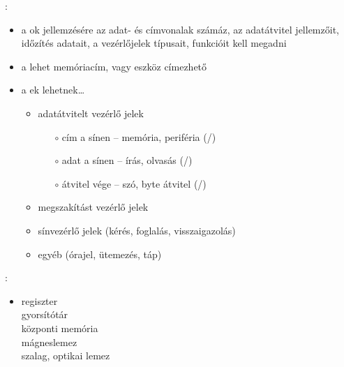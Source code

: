 \documentclass[main.tex]{subfiles}
\begin{document}
  {\large {}:}
  \begin{itemize}
    \item a ok jellemzésére
    az adat- és címvonalak számáz,
    az adatátvitel jellemzőit, időzítés adatait,
    a vezérlőjelek típusait, funkcióit kell megadni

    \item a  lehet memóriacím, vagy
     eszköz címezhető

    \item a ek lehetnek\dots
    \begin{itemize}
      \item adatátvitelt vezérlő jelek
      \begin{itemize}
        \item[$\circ$] cím a sínen
        \tabto{2.7cm} – \tabto{3.3cm}
        memória, periféria (/)

        \item[$\circ$] adat a sínen
        \tabto{2.7cm} – \tabto{3.3cm}
        írás, olvasás (/)

        \item[$\circ$] átvitel vége
        \tabto{2.7cm} – \tabto{3.3cm}
        szó, byte átvitel (/)
      \end{itemize}

      \item megszakítást vezérlő jelek
      \item sínvezérlő jelek (kérés, foglalás, visszaigazolás)
      \item egyéb (órajel, ütemezés, táp)
    \end{itemize}
  \end{itemize}

  
  {\large {}:}
  \begin{itemize}
    \item
    regiszter \\
    gyorsítótár \\
    központi memória \\
    mágneslemez \\
    szalag, optikai lemez
  \end{itemize}
\end{document}

